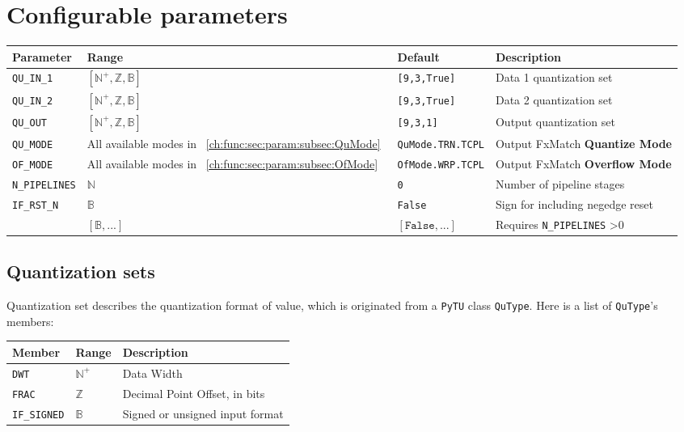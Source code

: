 \documentclass[a4paper, oneside]{report}
\begin{document}
        \section{Configurable parameters}
            \begin{longtable}{llll}
                \toprule
                \textbf{Parameter}  & \textbf{Range}  & \textbf{Default} & \textbf{Description} \\
                \midrule
                
                \texttt{QU\_IN\_1}     & $[\mathbb{N}^{+}, \mathbb{Z}, \mathbb{B}]$  & \texttt{[9,3,True]}                      &  Data 1 quantization set \\
                \texttt{QU\_IN\_2}    & $[\mathbb{N}^{+}, \mathbb{Z}, \mathbb{B}]$  & \texttt{[9,3,True]}                      & Data 2 quantization set \\
                \texttt{QU\_OUT}     & $[\mathbb{N}^{+}, \mathbb{Z}, \mathbb{B}]$  & \texttt{[9,3,1]}                      & Output quantization set \\
                \texttt{QU\_MODE}    & All available modes in ~\ref{ch:func:sec:param:subsec:QuMode}~       & \texttt{QuMode.TRN.TCPL}     & Output FxMatch \textbf{Quantize Mode} \\
                \texttt{OF\_MODE}   &  All available modes in  ~\ref{ch:func:sec:param:subsec:OfMode}~     & \texttt{OfMode.WRP.TCPL} & Output FxMatch \textbf{Overflow Mode}          \\
                \texttt{N\_PIPELINES}  & $\mathbb{N}$  & \texttt{0}  & Number of pipeline stages \\
                \texttt{IF\_RST\_N}  & $\mathbb{B}$  & \texttt{False}  & Sign for including negedge reset \\
                                    & $[\mathbb{B}, ...]$ & $[\texttt{False}, ...]$ & Requires \texttt{N\_PIPELINES} >0      \\             
                \bottomrule
            \end{longtable}
            \subsection{Quantization sets}\label{ch:func:sec:param:subsec:QuSet}
                Quantization set describes the quantization format of value, which is originated from a \texttt{PyTU} class \texttt{QuType}. Here is a list of \texttt{QuType}'s members:

            \begin{longtable}{lll}
                \toprule
                \textbf{Member} & \textbf{Range} & \textbf{Description} \\
                \midrule
                \texttt{DWT} &  $\mathbb{N}^{+}$ & Data Width \\
                \texttt{FRAC} & $\mathbb{Z}$ & Decimal Point Offset, in bits \\
                \texttt{IF\_SIGNED} & $\mathbb{B}$ & Signed or unsigned input format \\
                \bottomrule
            \end{longtable}
\end{document}
